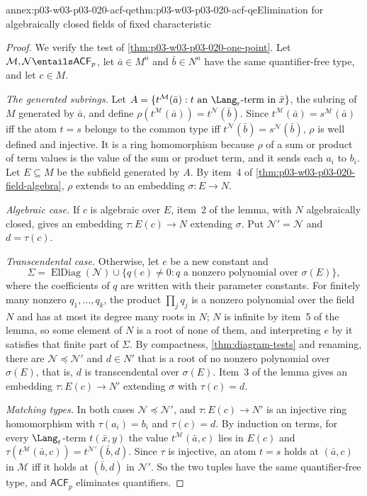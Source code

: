 \begin{annexitem}{annex:p03-w03-p03-020-acf-qe}{thm:p03-w03-p03-020-acf-qe}{Elimination for algebraically closed fields of fixed characteristic}
\begin{proof}
We verify the test of \cref{thm:p03-w03-p03-020-one-point}. Let
\(\mathcal M,\mathcal N\entails\mathsf{ACF}_p\), let \(\bar a\in M^n\) and
\(\bar b\in N^n\) have the same quantifier-free type, and let \(c\in M\).

\emph{The generated subrings.} Let \(A=\{t^{\mathcal M}(\bar a):t\text{ an }
\Lang_{\mathrm r}\text{-term in }\bar x\}\), the subring of \(M\)
generated by \(\bar a\), and define
\(\rho(t^{\mathcal M}(\bar a))=t^{\mathcal N}(\bar b)\). Since
\(t^{\mathcal M}(\bar a)=s^{\mathcal M}(\bar a)\) iff the atom \(t=s\)
belongs to the common type iff \(t^{\mathcal N}(\bar b)=s^{\mathcal N}(\bar b)\),
\(\rho\) is well defined and injective. It is a ring homomorphism because
\(\rho\) of a sum or product of term values is the value of the sum or
product term, and it sends each \(a_i\) to \(b_i\). Let \(E\subseteq M\) be
the subfield generated by \(A\). By item~4 of
\cref{thm:p03-w03-p03-020-field-algebra}, \(\rho\) extends to an embedding
\(\sigma:E\to N\).

\emph{Algebraic case.} If \(c\) is algebraic over \(E\), item~2 of the lemma,
with \(N\) algebraically closed, gives an embedding \(\tau:E(c)\to N\)
extending \(\sigma\). Put \(\mathcal N'=\mathcal N\) and \(d=\tau(c)\).

\emph{Transcendental case.} Otherwise, let \(e\) be a new constant and
\[
 \Sigma=\operatorname{ElDiag}(\mathcal N)\cup
 \{q(e)\ne0: q\text{ a nonzero polynomial over }\sigma(E)\},
\]
where the coefficients of \(q\) are written with their parameter constants.
For finitely many nonzero \(q_1,\ldots,q_k\), the product
\(\prod_jq_j\) is a nonzero polynomial over the field \(N\) and has at most
its degree many roots in \(N\); \(N\) is infinite by item~5 of the lemma, so
some element of \(N\) is a root of none of them, and interpreting \(e\) by
it satisfies that finite part of \(\Sigma\). By compactness,
\cref{thm:diagram-tests} and renaming, there are
\(\mathcal N\preccurlyeq\mathcal N'\) and \(d\in N'\) that is a root of no
nonzero polynomial over \(\sigma(E)\), that is, \(d\) is transcendental over
\(\sigma(E)\). Item~3 of the lemma gives an embedding
\(\tau:E(c)\to N'\) extending \(\sigma\) with \(\tau(c)=d\).

\emph{Matching types.} In both cases \(\mathcal N\preccurlyeq\mathcal N'\),
and \(\tau:E(c)\to N'\) is an injective ring homomorphism with
\(\tau(a_i)=b_i\) and \(\tau(c)=d\). By induction on terms, for every
\(\Lang_{\mathrm r}\)-term \(t(\bar x,y)\) the value
\(t^{\mathcal M}(\bar a,c)\) lies in \(E(c)\) and
\(\tau(t^{\mathcal M}(\bar a,c))=t^{\mathcal N'}(\bar b,d)\). Since
\(\tau\) is injective, an atom \(t=s\) holds at \((\bar a,c)\) in
\(\mathcal M\) iff it holds at \((\bar b,d)\) in \(\mathcal N'\). So the two
tuples have the same quantifier-free type, and \(\mathsf{ACF}_p\) eliminates
quantifiers.


\end{proof}
\end{annexitem}
